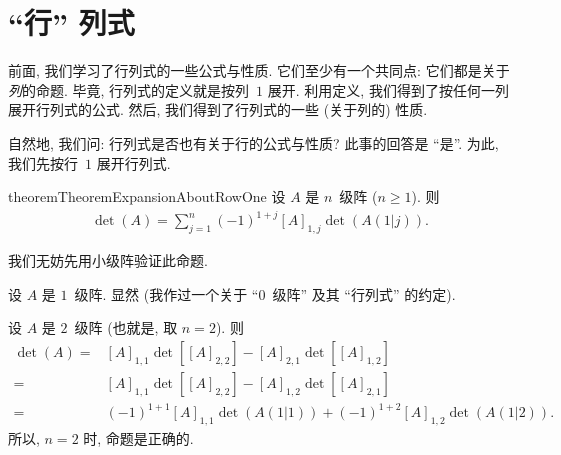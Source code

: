 \section{``行'' 列式}

前面, 我们学习了行列式的一些公式与性质.
它们至少有一个共同点:
它们都是关于\emph{列}的命题.
毕竟, 行列式的定义就是按列~\(1\) 展开.
利用定义,
我们得到了按任何一列展开行列式的公式.
然后, 我们得到了行列式的一些 (关于列的) 性质.

自然地, 我们问:
行列式是否也有关于行的公式与性质?
此事的回答是 ``是''.
为此, 我们先按行~\(1\) 展开行列式.

\begin{restatable}[]{theorem}{TheoremExpansionAboutRowOne}
    设 \(A\) 是 \(n\)~级阵 (\(n \geq 1\)).
    则
    \begin{align*}
        \det {(A)} = \sum_{j = 1}^{n}
        {(-1)^{1+j} [A]_{1,j} \det {(A(1|j))}}.
    \end{align*}
\end{restatable}

我们无妨先用小级阵验证此命题.

设 \(A\) 是 \(1\)~级阵.
显然
(我作过一个关于 ``\(0\)~级阵'' 及其 ``行列式'' 的约定).

设 \(A\) 是 \(2\)~级阵 (也就是, 取 \(n = 2\)).
则
\begin{align*}
    \det {(A)}
    = {} & [A]_{1,1} \det {[[A]_{2,2}]}
    - [A]_{2,1} \det {[[A]_{1,2}]}              \\
    = {} & [A]_{1,1} \det {[[A]_{2,2}]}
    - [A]_{1,2} \det {[[A]_{2,1}]}              \\
    = {} & (-1)^{1+1} [A]_{1,1} \det {(A(1|1))}
    + (-1)^{1+2} [A]_{1,2} \det {(A(1|2))}.
\end{align*}
所以, \(n = 2\) 时, 命题是正确的.

